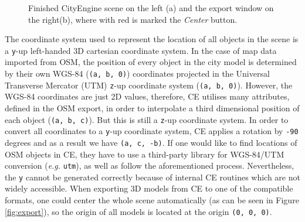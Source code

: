\begin{figure}[htb]
	\centering
	\caption{Finished CityEngine scene on the left (a) and the export window on the right(b), where with red is marked the \emph{Center} button.}
\end{figure}

The coordinate system used to represent the location of all objects in the scene is a \texttt{y}-up left-handed 3D cartesian coordinate system\cite{ceman}. In the case of map data imported from OSM, the position of every object in the city model is determined by their own WGS-84 (\texttt{(a, b, 0)}) coordinates projected in the Universal Transverse Mercator (UTM) \texttt{z}-up coordinate system (\texttt{(a, b, 0)}). However, the WGS-84 coordinates are just 2D values, therefore, CE utilises many attributes, defined in the OSM export, in order to interpolate a third dimensional position of each object (\texttt{(a, b, c)}). But this is still a \texttt{z}-up coordinate system. In order to convert all coordinates to a \texttt{y}-up coordinate system, CE applies a rotation by \texttt{-90} degrees and as a result we have \texttt{(a, c, -b)}. If one would like to find locations of OSM objects in CE, they have to use a third-party library for WGS-84/UTM conversion (\emph{e.g.} \texttt{utm}\cite{utm}), as well as follow the aforementioned process. Nevertheless, the \texttt{y} cannot be generated correctly because of internal CE routines which are not widely accessible. When exporting 3D models from CE to one of the compatible formats, one could center the whole scene automatically (as can be seen in Figure \ref{fig:export}), so the origin of all models is located at the origin \texttt{(0, 0, 0)}.

